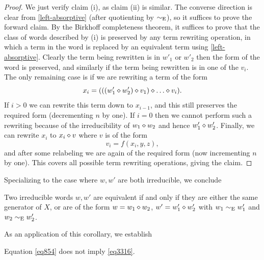 \begin{proof}  We just verify claim (i), as claim (ii) is similar.  The converse direction is clear from \eqref{left-absorptive} (after quotienting by $\sim_{\mathrm{E}}$), so it suffices to prove the forward claim. By the Birkhoff completeness theorem, it suffices to prove that the class of words described by (i) is preserved by any term rewriting operation, in which a term in the word is replaced by an equivalent term using \eqref{left-absorptive}.  Clearly the term being rewritten is in $w'_1$ or $w'_2$ then the form of the word is preserved, and similarly if the term being rewritten is in one of the $v_i$.  The only remaining case is if we are rewriting a term of the form
$$ x_i = (((w'_1 \op w'_2) \op v_1) \op \dots \op v_i).$$
If $i>0$ we can rewrite this term down to $x_{i-1}$, and this still preserves the required form (decrementing $n$ by one).  If $i=0$ then we cannot perform such a rewriting because of the irreducibility of $w_1 \diamond w_2$ and hence $w'_1 \diamond w'_2$.  Finally, we can rewrite $x_i$ to $x_i \diamond v$ where $v$ is of the form
$$ v_i = f(x_i,y,z),$$
and after some relabeling we are again of the required form (now incrementing $n$ by one). This covers all possible term rewriting operations, giving the claim.
\end{proof}

Specializing to the case where $w,w'$ are both irreducible, we conclude

\begin{corollary}\label{unique-factorization}  Two irreducible words $w, w'$ are equivalent if and only if they are either the same generator of $X$, or are of the form $w = w_1 \diamond w_2$, $w' = w'_1 \diamond w'_2$ with $w_1 \sim_{\mathrm{E}} w'_1$ and $w_2 \sim_{\mathrm{E}} w'_2$.
\end{corollary}

As an application of this corollary, we establish

\begin{proposition}\label{854-3316} Equation \eqref{eq854} does not imply \eqref{eq3316}.
\end{proposition}

